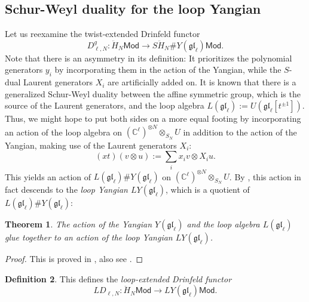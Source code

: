 \documentclass[11pt]{report}
\newtheorem{theorem}{Theorem}[section]
\theoremstyle{definition}
\newtheorem{definition}[theorem]{Definition}
\theoremstyle{remark}
\theoremstyle{remark}
\newcommand{\C}{\mathbb{C}}
\begin{document}
\subsection{Schur-Weyl duality for the loop Yangian}

Let us reexamine the twist-extended Drinfeld functor
\begin{equation*}
D_{\ell,N}^g: \ddot H_N\mathsf{Mod} \to S\ddot H_N \# Y(\mathfrak{gl}_\ell) \mathsf{Mod}.
\end{equation*}
Note that there is an asymmetry in its definition: It prioritizes the polynomial generators $y_i$ by incorporating them in the action of the Yangian, while the $S$-dual Laurent generators $X_i$ are artificially added on. It is known that there is a generalized Schur-Weyl duality between the affine symmetric group, which is the source of the Laurent generators, and the loop algebra $L(\mathfrak{gl}_\ell) := U(\mathfrak{gl}_\ell[t^{\pm 1}])$. Thus, we might hope to put both sides on a more equal footing by incorporating an action of the loop algebra on $(\C^\ell)^{\otimes N} \otimes_{S_N} U$ in addition to the action of the Yangian, making use of the Laurent generators $X_i$:
\begin{equation*}
(x t)(v \otimes u) := \sum_i x_i v \otimes X_i u.
\end{equation*}
This yields an action of $L(\mathfrak{gl}_\ell) \# Y(\mathfrak{gl}_\ell)$ on $(\C^\ell)^{\otimes N} \otimes_{S_N} U$. By \cite{article:guay:2005}, this action in fact descends to the \emph{loop Yangian $LY(\mathfrak{gl}_\ell)$}, which is a quotient of $L(\mathfrak{gl}_\ell) \# Y(\mathfrak{gl}_\ell)$:

\begin{theorem}
The action of the Yangian $Y(\mathfrak{gl}_\ell)$ and the loop algebra $L(\mathfrak{gl}_\ell)$ glue together to an action of the loop Yangian $LY(\mathfrak{gl}_\ell)$.
\end{theorem}

\begin{proof}
This is proved in \cite{article:guay:2005}, also see \cite{article:kodera:2016}.
\end{proof}

\begin{definition}
This defines the \emph{loop-extended Drinfeld functor}
\begin{equation*}
LD_{\ell,N}: \ddot H_N\mathsf{Mod} \to LY(\mathfrak{gl}_\ell) \mathsf{Mod}.
\end{equation*}
\end{definition}
\end{document}
